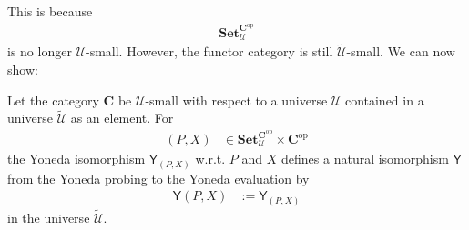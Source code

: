 This is because
\begin{align*}
  \mathbf{Set}_{\mathcal{U}}^{\mathbf{C}^{\mathrm{op}}}
\end{align*}
is no longer $\mathcal{U}$-small.
However, the functor category is still $\tilde{\mathcal{U}}$-small.
We can now show:
\\
\begin{lem}
\label{lem:yonedaadd}
Let the category $\mathbf{C}$ be $\mathcal{U}$-small with respect to a universe $\mathcal{U}$ contained in a universe $\tilde{\mathcal{U}}$ as an element.
For
\begin{align*}
  (P,X)
  &\in
  \mathbf{Set}_{\mathcal{U}}^{\mathbf{C}^{\mathrm{op}}}
  \times
  \mathbf{C}^{\mathrm{op}}
\end{align*}
the Yoneda isomorphism $\mathsf{Y}_{(P,X)}$ w.r.t. $P$ and $X$ defines a natural isomorphism $\mathsf{Y}$ from the Yoneda probing to the Yoneda evaluation by
\begin{align*}
  \mathsf{Y}(P,X)
  &:=
  \mathsf{Y}_{(P,X)}
\end{align*}
in the universe $\tilde{\mathcal{U}}$.
\end{lem}
